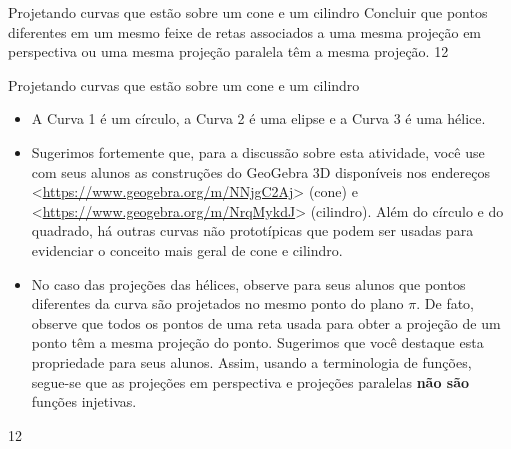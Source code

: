 \clearmargin
\begin{objectives}{Projetando curvas que estão sobre um cone e um cilindro}
{
Concluir que pontos diferentes em um mesmo feixe de retas associados a uma mesma projeção em perspectiva ou uma mesma projeção paralela têm a mesma projeção.
}{1}{2}
\end{objectives}
\begin{sugestions}{Projetando curvas que estão sobre um cone e um cilindro}
{
\begin{itemize}
\item {} 
A Curva 1 é um círculo, a Curva 2 é uma elipse e a Curva 3 é uma hélice.

\item {} 
Sugerimos fortemente que, para a discussão sobre esta atividade, você use com seus alunos as construções do GeoGebra 3D disponíveis nos endereços \textless{}\url{https://www.geogebra.org/m/NNjgC2Aj}\textgreater{} (cone) e \textless{}\url{https://www.geogebra.org/m/NrqMykdJ}\textgreater{} (cilindro). Além do círculo e do quadrado, há outras curvas não prototípicas que podem ser usadas para evidenciar o conceito mais geral de cone e cilindro.

\item {} 
No caso das projeções das hélices, observe para seus alunos que pontos diferentes da curva são projetados no mesmo ponto do plano \(\pi\). De fato, observe que todos os pontos de uma reta usada para obter a projeção de um ponto têm a mesma projeção do ponto. Sugerimos que você destaque esta propriedade para seus alunos. Assim, usando a terminologia de funções, segue-se que as projeções em perspectiva e projeções paralelas \textbf{não são} funções injetivas.

\end{itemize}
}{1}{2}
\end{sugestions}
